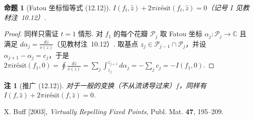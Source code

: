 \documentclass[11pt, a4paper, oneside]{ctexart}
\newtheorem{proposition}[theorem]{命题}
\newtheorem{remark}[theorem]{注}
\newcommand{\C}{\mathbb{C}}
\newcommand{\cP}{\mathcal{P}}
\newcommand{\ri}{\mathrm{résit}}
\begin{document}
    \begin{proposition}[Fatou 坐标恒等式 (12.12)]
        $I(f_t,\hat{z})+2\pi i\ri(f_t,\hat{z})=0$（记号 $I$ 见教材注~10.12）.
    \end{proposition}
    \begin{proof}
        同样只需证 $t=1$ 情形. 对 $f_1$ 的每个花瓣 $\cP_j$ 取 Fatou 坐标 $\alpha_j:\cP_j\to \C$ 且满足 $d\alpha_j=\frac{dz}{v(z)}$（见教材注~10.12）. 取基点 $z_j\in\cP_{j-1}\cap \cP_j$，并设 $\alpha_{j+1}-\alpha_j=c_j$，于是 $2\pi i\ri(f_1,0)=\oint \frac{dz}{v(z)}=\sum\limits_{j}\int_{z_j}^{z_{j+1}}d\alpha_j=-\sum\limits_{j}c_j=-I(f_1,0)$.
    \end{proof}
    \begin{remark}[推广 (12.12)]
        对于一般的变换（不从流诱导过来）$f$，同样有 $I(f,\hat{z})+2\pi i\ri(f,\hat{z})=0$.
    \end{remark}

    \begin{thebibliography}{}
        X. Buff [2003], \emph{Virtually Repelling Fixed Points}, Publ. Mat. \textbf{47}, 195--209.
    \end{thebibliography}
\end{document}
